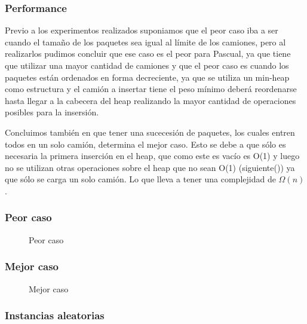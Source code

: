 \documentclass[a4paper, 10pt, twoside]{article}
\newcommand{\tresgraficos}[3]{
    \newcommand{\separacion}{-2.2em}
    \vspace{\separacion}
    
    \vspace{\separacion}
    
    \vspace{\separacion}
    
}
\begin{document}
\subsubsection{Performance}

Previo a los experimentos realizados suponiamos que el peor caso iba a ser cuando el tamaño de los paquetes sea igual al límite de los camiones, pero al realizarlos pudimos concluir que ese caso es el peor para Pascual, ya que tiene que utilizar una mayor cantidad de camiones y que el peor caso es cuando los paquetes están ordenados en forma decreciente, ya que se utiliza un min-heap como estructura y el camión a insertar tiene el peso mínimo
deberá reordenarse hasta llegar a la cabecera del heap realizando la mayor cantidad de operaciones posibles para la insersión.

Concluimos también en que tener una sucecesión de paquetes, los cuales entren todos en un solo camión, determina el mejor caso. Esto se debe a que sólo es necesaria la primera inserción en el heap, que como este es vacío es O(1) y luego no se utilizan otras operaciones sobre el heap que no sean O(1) (siguiente()) ya que sólo se carga un solo camión. Lo que lleva a tener una complejidad de $\Omega(n)$.

\subsubsection{Peor caso}

\begin{figure}[H]
  \centering
  \tresgraficos{problema1-peor-caso}
               {problema1-peor-caso-logn}
               {problema1-peor-caso-n}               
  \caption{Peor caso}
\end{figure}


\subsubsection{Mejor caso}

\begin{figure}[H]
  \centering
  \tresgraficos{problema1-mejor-caso}
               {problema1-mejor-caso-logn}
               {problema1-mejor-caso-n}
  \caption{Mejor caso}
\end{figure}


\subsubsection{Instancias aleatorias}
\end{document}

